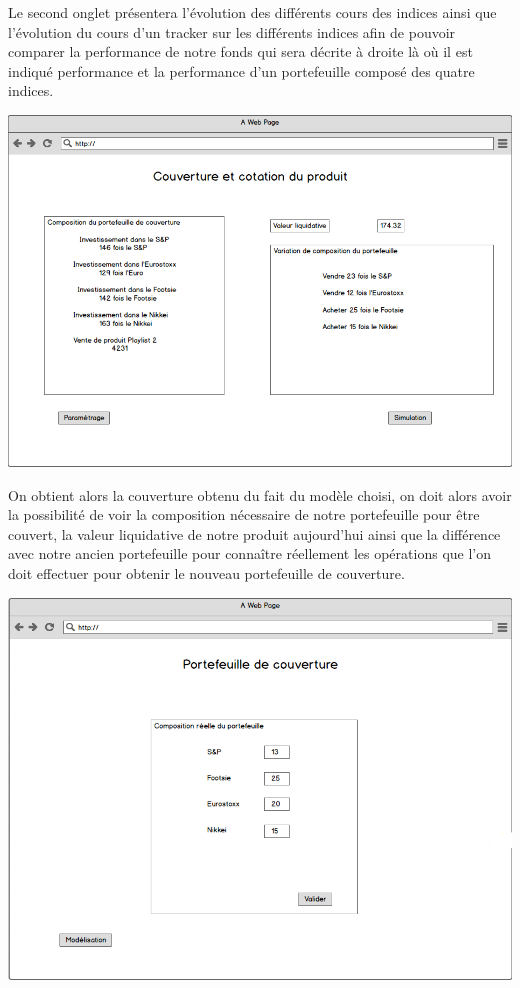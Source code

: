 \documentclass[french,12pt,a4paper]{article}
\begin{document}
Le second onglet présentera l'évolution des différents cours des indices ainsi que l'évolution du cours d'un tracker sur les différents indices afin de pouvoir comparer la performance de notre fonds qui sera décrite à droite là où il est indiqué performance et la performance d'un portefeuille composé des quatre indices.


\begin{center}
\includegraphics[scale=0.4]{../Images/Maquette_4.png}
\end{center}

On obtient alors la couverture obtenu du fait du modèle choisi, on doit alors avoir la possibilité de voir la composition nécessaire de notre portefeuille pour être couvert, la valeur liquidative de notre produit aujourd'hui ainsi que la différence avec notre ancien portefeuille pour connaître réellement les opérations que l'on doit effectuer pour obtenir le nouveau portefeuille de couverture.

\begin{center}
\includegraphics[scale=0.4]{../Images/Maquette_6.png}
\end{center}
\end{document}
